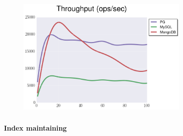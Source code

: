 \documentclass[usenames,dvipsnames, 18pt, compress, aspectratio=169]{beamer}
\begin{document}
\begin{frame}
    \frametitle{}
    \begin{center}
    \begin{figure}
        \includegraphics[width=0.75\textwidth,center]{benchmarks/select_jsonb_path_ops_no_parse_throughput.png}
    \end{figure}
    \end{center}
\end{frame}



\begin{frame}
    \frametitle{}
    \begin{center}
        \textbf{Index maintaining}
    \end{center}
\end{frame}


\end{document}
